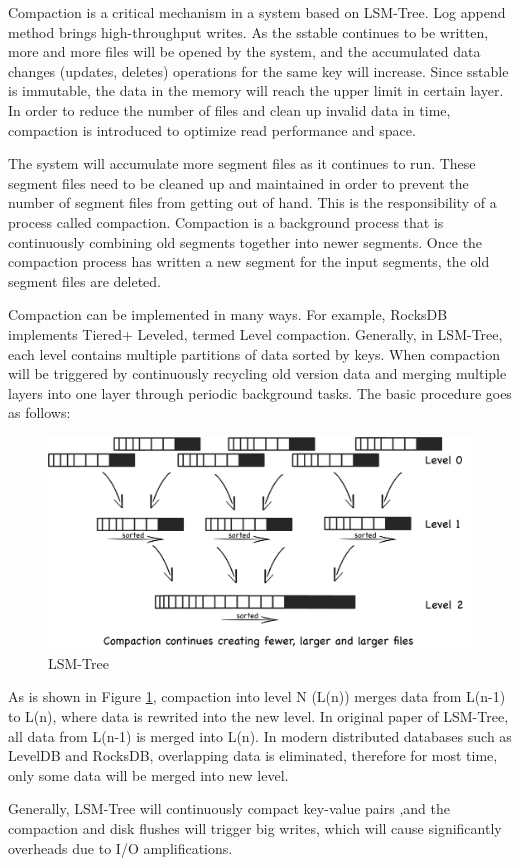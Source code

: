 \documentclass[a4paper,10pt,twoside]{article}
\begin{document}
Compaction\cite{10.14778/2757807.2757810} is a critical mechanism in a system based on LSM-Tree. 
Log append method brings high-throughput writes. 
As the sstable continues to be written, more and more files will be opened by the system, and the accumulated data changes (updates, deletes) operations for the same key will increase. 
Since sstable is immutable, the data in the memory will reach the upper limit in certain layer.
In order to reduce the number of files and clean up invalid data in time, compaction is introduced to optimize read performance and space.
\par
The system will accumulate more segment files as it continues to run. 
These segment files need to be cleaned up and maintained in order to prevent the number of segment files from getting out of hand. 
This is the responsibility of a process called compaction. 
Compaction is a background process that is continuously combining old segments together into newer segments.
Once the compaction process has written a new segment for the input segments, the old segment files are deleted.
\par
Compaction can be implemented in many ways. For example, RocksDB implements Tiered+ Leveled, termed Level compaction\cite{RocksDB_compaction_algo1}. 
Generally, in LSM-Tree, each level contains multiple partitions of data sorted by keys. When  compaction will be triggered by continuously recycling old version data and merging multiple layers into one layer through periodic background tasks.
The basic procedure goes as follows:
\begin{figure}[h]
    \centering
	\includegraphics[scale=0.3]{LSM_Tree1.png}
	\caption{LSM-Tree \cite{LSM-Tree-Fig}}
    \label{fig:mesh1}
\end{figure}
\par
As is shown in Figure \ref{fig:mesh1}, compaction into level N (L(n)) merges data from L(n-1) to L(n), where data is rewrited into the new level. 
In original paper of LSM-Tree, all data from L(n-1) is merged into L(n). 
In modern distributed databases such as LevelDB and RocksDB, overlapping data is eliminated, therefore for most time, only some data will be merged into new level.
\par
Generally, LSM-Tree will continuously compact key-value pairs ,and the compaction and disk flushes will trigger big writes, which will cause significantly overheads due to I/O amplifications.
\end{document}
